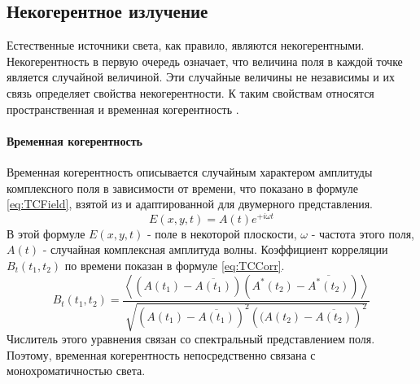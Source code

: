 \subsection{Некогерентное излучение}
Естественные источники света, как правило, являются некогерентными. Некогерентность в первую очередь означает, что величина поля в каждой точке является случайной величиной. Эти случайные величины не независимы и их связь определяет свойства некогерентности. К таким свойствам относятся пространственная и временная когерентность \cite{Ahmanov}.


\paragraph{Временная когерентность}
Временная когерентность описывается случайным характером амплитуды комплексного поля в зависимости от времени, что показано в формуле \ref{eq:TCField}, взятой из \cite{Ahmanov} и адаптированной для двумерного представления.
\begin{equation}\label{eq:TCField}
	E(x,y,t) = A(t)e^{+i{\omega}t}
\end{equation}
В этой формуле $E(x,y,t)$ - поле в некоторой плоскости, $\omega$ - частота этого поля, $A(t)$ - случайная комплексная амплитуда волны. Коэффициент корреляции $B_t(t_1,t_2)$ по времени показан в формуле \ref{eq:TCCorr}.
\begin{equation}\label{eq:TCCorr}
	B_t(t_1,t_2)=\frac
	{\left<\left(A(t_1) - \overline{A(t_1)}\right)\left(A^*(t_2) - \overline{A^*(t_2)}\right)\right>}
	{\sqrt{\left(A(t_1) - \overline{A(t_1)}\right)^2\left((A(t_2) - \overline{A(t_2)}\right)^2}}
\end{equation}
Числитель этого уравнения связан со спектральный представлением поля. Поэтому, временная когерентность непосредственно связана с монохроматичностью света.


